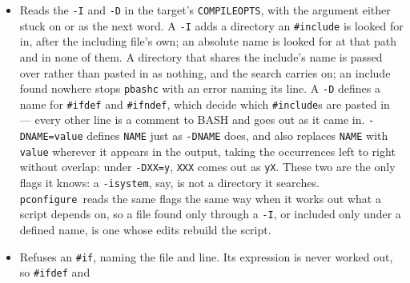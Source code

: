 \documentclass{article}
\newcommand{\pconfigure}{\texttt{pconfigure}}
\begin{document}
\begin{itemize}
  Each file is pasted in at most once: an \texttt{\#include} of a
  file that is already in the output is skipped, so two helpers that
  include each other are fine, and each comes out once.  The script
  itself counts as in the output, so a helper that includes it back
  doesn't paste it a second time.  A file is the same file however
  its \texttt{\#include} spells it: \texttt{../common.bash} from a
  subdirectory, \texttt{./helper.bash}, or a path through a symbolic
  link all name what they lead to.  \pconfigure\
  doesn't keep the same list when it works out what a script depends
  on, or which headers a C or C++ source reads.  It only refuses to
  follow an \texttt{\#include} back into a file it is still in the
  middle of reading, which is enough to get it out of a cycle like
  that one, or of two headers guarded by \texttt{\#pragma once} that
  include each other.  A file reached again some other way is read
  again, since a header with no guard can include something different
  the second time; for a script that can mean a dependency listed
  twice, but never one left out.
\item Reads the \texttt{-I} and \texttt{-D} in the target's
  \texttt{COMPILEOPTS}, with the argument either stuck on or as the
  next word.  A \texttt{-I} adds a directory an \texttt{\#include} is
  looked for in, after the including file's own; an absolute name is
  looked for at that path and in none of them.  A directory that
  shares the include's name is passed over rather than pasted in as
  nothing, and the search carries on; an include found nowhere stops
  \texttt{pbashc} with an error naming its line.  A \texttt{-D}
  defines a name for \texttt{\#ifdef} and \texttt{\#ifndef}, which
  decide which \texttt{\#include}s are pasted in --- every other line
  is a comment to BASH and goes out as it came in.
  \texttt{-DNAME=value} defines \texttt{NAME} just as
  \texttt{-DNAME} does, and also replaces \texttt{NAME} with
  \texttt{value} wherever it appears in the output, taking the
  occurrences left to right without overlap: under
  \texttt{-DXX=y}, \texttt{XXX} comes out as \texttt{yX}.  These two are
  the only flags it knows: a \texttt{-isystem}, say, is not a
  directory it searches.  \pconfigure\ reads the same flags the same
  way when it works out what a script depends on, so a file found
  only through a \texttt{-I}, or included only under a defined name,
  is one whose edits rebuild the script.
\item Refuses an \texttt{\#if}, naming the file and line.  Its
  expression is never worked out, so \texttt{\#ifdef} and

\end{itemize}
\end{document}
